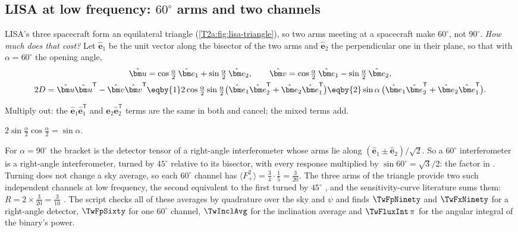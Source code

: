 \subsection{LISA at low frequency: \texorpdfstring{$60^\circ$}{60 degree} arms and two channels}

LISA's three spacecraft form an equilateral triangle (\cref{T2a:fig:lisa-triangle}), so two arms meeting at a spacecraft make $60^\circ$, not $90^\circ$. \emph{How much does that cost?} Let $\hat{\bm e}_1$ be the unit vector along the bisector of the two arms and $\hat{\bm e}_2$ the perpendicular one in their plane, so that with $\alpha=60^\circ$ the opening angle,
\begin{align}
  \hat{\bm u}&=\cos\tfrac\alpha2\,\hat{\bm e}_1+\sin\tfrac\alpha2\,\hat{\bm e}_2,\qquad
  \hat{\bm v}=\cos\tfrac\alpha2\,\hat{\bm e}_1-\sin\tfrac\alpha2\,\hat{\bm e}_2,\nonumber\\
  2D=\hat{\bm u}\hat{\bm u}^{\mathsf T}-\hat{\bm v}\hat{\bm v}^{\mathsf T}
  &\eqby{1}2\cos\tfrac\alpha2\sin\tfrac\alpha2\big(\hat{\bm e}_1\hat{\bm e}_2^{\mathsf T}+\hat{\bm e}_2\hat{\bm e}_1^{\mathsf T}\big)
  \eqby{2}\sin\alpha\,\big(\hat{\bm e}_1\hat{\bm e}_2^{\mathsf T}+\hat{\bm e}_2\hat{\bm e}_1^{\mathsf T}\big).
  \label{T2g:eq:sixty}
\end{align}
\begin{explain}
  \item Multiply out: the $\hat{\bm e}_1\hat{\bm e}_1^{\mathsf T}$ and $\hat{\bm e}_2\hat{\bm e}_2^{\mathsf T}$ terms are the same in both and cancel; the mixed terms add.
  \item $2\sin\tfrac\alpha2\cos\tfrac\alpha2=\sin\alpha$.
\end{explain}
For $\alpha=90^\circ$ the bracket is the detector tensor of a right-angle interferometer whose arms lie along $(\hat{\bm e}_1\pm\hat{\bm e}_2)/\sqrt2$. So a $60^\circ$ interferometer is a right-angle interferometer, turned by $45^\circ$ relative to its bisector, with every response multiplied by $\sin60^\circ=\sqrt3/2$: the factor in \cite[eq.~(14)]{BarackCutler2004}. Turning does not change a sky average, so each $60^\circ$ channel has $\langle F_+^2\rangle=\tfrac34\cdot\tfrac15=\tfrac{3}{20}$. The three arms of the triangle provide two such independent channels at low frequency, the second equivalent to the first turned by $45^\circ$ \cite[eqs.~(12), (15b)]{BarackCutler2004}, and the sensitivity-curve literature sums them: $R=2\times\tfrac3{20}=\tfrac3{10}$ \cite[eqs.~(8)--(9)]{Robson2019}. The script  checks all of these averages by quadrature over the sky and $\psi$ and finds $\TwFpNinety$ and $\TwFxNinety$ for a right-angle detector, $\TwFpSixty$ for one $60^\circ$ channel, $\TwInclAvg$ for the inclination average and $\TwFluxInt\,\pi$ for the angular integral of the binary's power.

